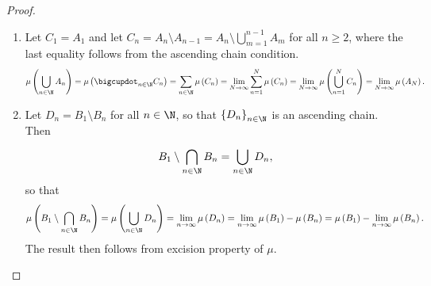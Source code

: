 \documentclass[pmath451]{subfiles}
\begin{document}
    \begin{proof}
        \begin{enumerate}
            \item Let $C_1 = A_1$ and let $C_n = A_n\setminus A_{n-1} = A_n\setminus \bigcup^{n-1}_{m=1} A_m$ for all $n\geq 2$, where the last equality follows from the ascending chain condition. 
                \begin{equation*}
                    \mu\left( \bigcup^{}_{n\in\N}A_n \right) = \mu\left( \bigcupdot^{}_{n\in\N}C_n \right) = \sum^{}_{n\in\N} \mu\left( C_n \right) = \lim_{N\to\infty} \sum^{N}_{n=1} \mu\left( C_n \right) = \lim_{N\to\infty} \mu\left( \bigcup^{N}_{n=1}C_n \right) = \lim_{N\to\infty} \mu\left( A_N \right).
                \end{equation*}

        \item Let $D_n = B_1\setminus B_n$ for all $n\in\N$, so that $\left\lbrace D_n \right\rbrace^{}_{n\in\N}$ is an ascending chain. Then
            \begin{equation*}
                B_1\setminus \bigcap^{}_{n\in\N} B_n = \bigcup^{}_{n\in\N} D_n,
            \end{equation*}
            so that
            \begin{equation*}
                \mu\left( B_1\setminus \bigcap^{}_{n\in\N} B_n \right) = \mu\left( \bigcup^{}_{n\in\N} D_n \right) = \lim_{n\to\infty}\mu\left( D_n \right) = \lim_{n\to\infty} \mu\left( B_1 \right) - \mu\left( B_n \right) = \mu\left( B_1 \right) - \lim_{n\to\infty} \mu\left( B_n \right).
            \end{equation*}
            The result then follows from excision property of $\mu$.
        \end{enumerate}
    \end{proof}
    
\end{document}
